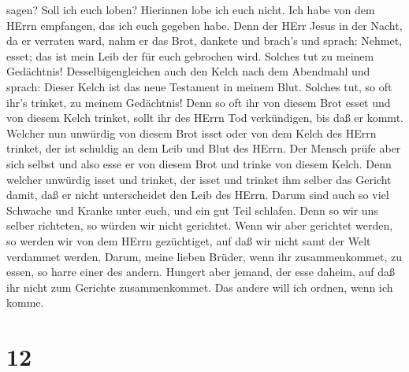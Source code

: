 sagen? Soll ich euch loben? Hierinnen lobe ich euch nicht. 
Ich habe von dem HErrn empfangen, das ich euch gegeben habe. Denn der
HErr Jesus in der Nacht, da er verraten ward, nahm er das Brot,
 dankete und brach's und sprach: Nehmet, esset; das ist
mein Leib der für euch gebrochen wird. Solches tut zu meinem Gedächtnis!
 Desselbigengleichen auch den Kelch nach dem Abendmahl und
sprach: Dieser Kelch ist das neue Testament in meinem Blut. Solches tut,
so oft ihr's trinket, zu meinem Gedächtnis!  Denn so oft
ihr von diesem Brot esset und von diesem Kelch trinket, sollt ihr des
HErrn Tod verkündigen, bis daß er kommt.  Welcher nun
unwürdig von diesem Brot isset oder von dem Kelch des HErrn trinket, der
ist schuldig an dem Leib und Blut des HErrn.  Der Mensch
prüfe aber sich selbst und also esse er von diesem Brot und trinke von
diesem Kelch.  Denn welcher unwürdig isset und trinket, der
isset und trinket ihm selber das Gericht damit, daß er nicht
unterscheidet den Leib des HErrn.  Darum sind auch so viel
Schwache und Kranke unter euch, und ein gut Teil schlafen. 
Denn so wir uns selber richteten, so würden wir nicht gerichtet.
 Wenn wir aber gerichtet werden, so werden wir von dem
HErrn gezüchtiget, auf daß wir nicht samt der Welt verdammet werden.
 Darum, meine lieben Brüder, wenn ihr zusammenkommet, zu
essen, so harre einer des andern.  Hungert aber jemand, der
esse daheim, auf daß ihr nicht zum Gerichte zusammenkommet. Das andere
will ich ordnen, wenn ich komme.

\hypertarget{section-11}{%
\section{12}\label{section-11}}

